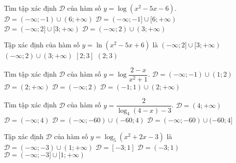 \begin{ex}
	Tìm tập xác định $\mathscr{D}$ của hàm số $y=\log\left(x^2-5x-6\right)$.
	\choice
	{\True $\mathscr{D}=(-\infty;-1)\cup(6;+\infty)$}
	{$\mathscr{D}=(-\infty;-1]\cup[6;+\infty)$}
	{$\mathscr{D}=(-\infty;2]\cup[3;+\infty)$}
	{$\mathscr{D}=(-\infty;2)\cup(3;+\infty)$}
\end{ex}

\begin{ex}
	Tập xác định của hàm số $y=\ln\left(x^2-5x+6\right)$ là
	\choice
	{$(-\infty;2]\cup[3;+\infty)$}
	{\True $(-\infty;2)\cup(3;+\infty)$}
	{$[2;3]$}
	{$(2;3)$}
\end{ex}

\begin{ex}
	Tìm tập xác định $\mathscr{D}$ của hàm số $y=\log\dfrac{2-x}{x^2+1}$.
	\choice
	{$\mathscr{D}=(-\infty;-1)\cup(1;2)$}
	{$\mathscr{D}=(2;+\infty)$}
	{\True $\mathscr{D}=(-\infty;2)$}
	{$\mathscr{D}=(-1;1)\cup(2;+\infty)$}
\end{ex}

\begin{ex}
	Tìm tập xác định $\mathscr D$ của hàm số $y = \dfrac{2}{\log_4 (4 - x) - 3}$.
	\choice
	{$  \mathscr D = (4; +\infty) $}
	{$ \mathscr D = (-\infty; 4)  $}
	{\True $ \mathscr D = (-\infty; -60) \cup (-60; 4) $}
	{$ \mathscr D = (-\infty; -60) \cup (-60; 4] $}
\end{ex}

\begin{ex}
	Tập xác định $\mathscr{D}$ của hàm số $y=\log_5(x^2+2x-3)$ là
	\choice
	{\True $\mathscr{D}=(-\infty;-3)\cup(1;+\infty)$}
	{$\mathscr{D}=[-3;1]$}
	{$\mathscr{D}=(-3;1)$}
	{$\mathscr{D}=(-\infty;-3]\cup[1;+\infty)$}
\end{ex}



